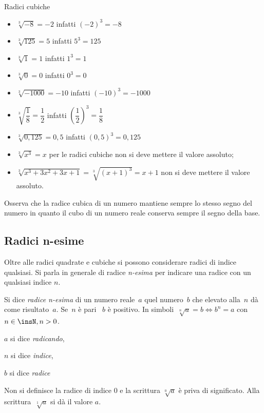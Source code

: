 \begin{exrig}
\begin{esempio}
Radici cubiche
 \begin{multicols}{2}
 \begin{itemize}
\item $\sqrt[3]{-8}=-2$ infatti $\left(-2\right)^3=-8$
\item $\sqrt[3]{125}=5$ infatti $5^3=125$
\item $\sqrt[3]1=1$ infatti $1^3=1$
\item $\sqrt[3]0=0$ infatti $0^3=0$
\item $\sqrt[3]{-1000}=-10$ infatti $\left(-10\right)^3=-1000$
\item $\sqrt[3]{\dfrac 1 8}=\dfrac 1 2$ infatti 
  $\left(\dfrac 1 2\right)^3=\dfrac 1 8$
\item $\sqrt[3]{0,125}=0,5$ infatti $(0,5)^3=0,125$
\item $\sqrt[3]{x^3}=x$ per le radici cubiche non si deve mettere 
  il valore assoluto;
\item $\sqrt[3]{x^3+3x^2+3x+1}=\sqrt[3]{(x+1)^3}=x+1$ non si deve mettere 
  il valore assoluto.
\end{itemize}
\end{multicols}
\end{esempio}
\end{exrig}

Osserva che la radice cubica di un numero mantiene sempre lo stesso segno del 
numero in quanto il cubo di un numero reale conserva sempre il segno della 
base.

\subsection{Radici n-esime}
Oltre alle radici quadrate e cubiche si possono considerare radici di indice 
qualsiasi. 
Si parla in generale di radice \emph{n-esima} per indicare una radice con un 
qualsiasi indice $n$.

\begin{definizione}
Si dice \emph{radice n-esima} di un numero reale~$a$ quel numero~$b$ che 
elevato alla~$n$ dà come risultato~$a$. Se~$n$ è pari ~$b$ è positivo.
In simboli~$\sqrt[n]a=b \Leftrightarrow b^n=a$ con $n\in \insN, n > 0$.

$a$ si dice \emph{radicando}, 

$n$ si dice \emph{indice}, 

$b$ si dice \emph{radice}

Non si definisce la radice di indice $0$ e la scrittura $\sqrt[0]a$ è priva 
di significato. Alla scrittura~$\sqrt[1]a$ si dà il valore $a$.
\end{definizione}

